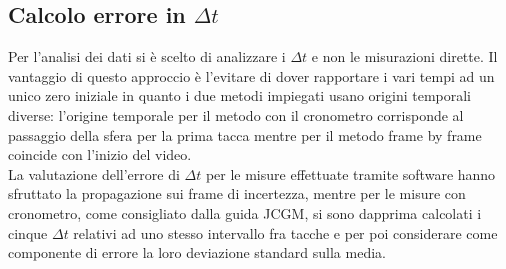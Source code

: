 \documentclass[a4paper,11pt,oneside]{article}
\begin{document}
\subsection*{Calcolo errore in $\Delta t$}
Per l'analisi dei dati si è scelto di analizzare i $\Delta t$ e non le misurazioni dirette. Il vantaggio di questo approccio è l'evitare di dover rapportare i vari tempi ad un unico zero iniziale in quanto i due metodi impiegati usano origini temporali diverse: l'origine temporale per il metodo con il cronometro corrisponde al passaggio della sfera per la prima tacca mentre per il metodo frame by frame coincide con l'inizio del video.\\
La valutazione dell'errore di $\Delta t$ per le misure effettuate tramite software hanno sfruttato la propagazione sui frame di incertezza, mentre per le misure con cronometro, come consigliato dalla guida JCGM, si sono dapprima calcolati i cinque $\Delta t$ relativi ad uno stesso intervallo fra tacche e per poi considerare come componente di errore la loro deviazione standard sulla media.

\end{document}
